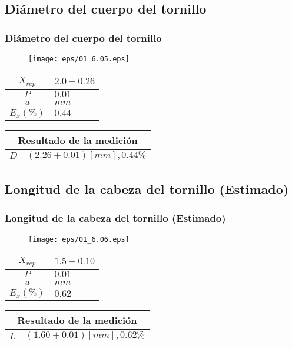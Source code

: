 \documentclass[letter,11pt]{beamer}
\begin{document}
\subsection{Diámetro del cuerpo del tornillo}
\begin{frame}
\frametitle{Diámetro del cuerpo del tornillo}
\vspace*{0.8cm}
\begin{figure}
\centering
\texttt{[image: eps/01\_6.05.eps]}
\end{figure}
\vspace*{0.4cm}
\scriptsize
\begin{tabular}{|c|>{\centering}m{1.8cm}<{\centering}|}
\hline
$X_{rep}$ &  $2.0+0.26$ \tabularnewline \hline
      $P$ &      $0.01$ \tabularnewline \hline
      $u$ &        $mm$ \tabularnewline \hline
$E_x(\%)$ &      $0.44$ \tabularnewline \hline
\end{tabular}
\quad
\begin{tabular}{|c|>{\centering}m{5.7cm}<{\centering}|}
\hline
\multicolumn{2}{|c|}{\textbf{Resultado de la medición}} \\ \hline
$D$ & $( 2.26\pm0.01)[mm], 0.44\%$ \tabularnewline \hline
\end{tabular}
\end{frame}

\subsection{Longitud de la cabeza del tornillo (Estimado)}
\begin{frame}
\frametitle{Longitud de la cabeza del tornillo (Estimado)}
\vspace*{0.8cm}
\begin{figure}
\centering
\texttt{[image: eps/01\_6.06.eps]}
\end{figure}
\vspace*{0.4cm}
\scriptsize
\begin{tabular}{|c|>{\centering}m{1.8cm}<{\centering}|}
\hline
$X_{rep}$ &  $1.5+0.10$ \tabularnewline \hline
      $P$ &      $0.01$ \tabularnewline \hline
      $u$ &        $mm$ \tabularnewline \hline
$E_x(\%)$ &      $0.62$ \tabularnewline \hline
\end{tabular}
\quad
\begin{tabular}{|c|>{\centering}m{5.7cm}<{\centering}|}
\hline
\multicolumn{2}{|c|}{\textbf{Resultado de la medición}} \\ \hline
$L$ & $( 1.60\pm0.01)[mm], 0.62\%$ \tabularnewline \hline
\end{tabular}
\end{frame}
\end{document}
